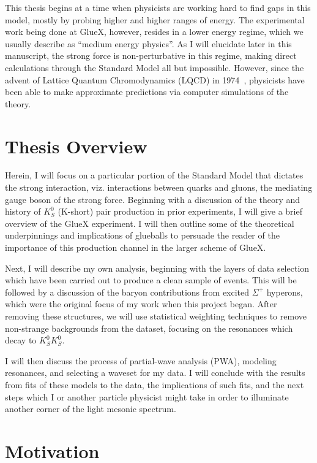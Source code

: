 This thesis begins at a time when physicists are working hard to find gaps in this model, mostly by probing higher and higher ranges of energy. The experimental work being done at GlueX, however, resides in a lower energy regime, which we usually describe as ``medium energy physics''. As I will elucidate later in this manuscript, the strong force is non-perturbative in this regime, making direct calculations through the Standard Model all but impossible. However, since the advent of Lattice Quantum Chromodynamics (LQCD) in 1974~\cite{Wilson1974}, physicists have been able to make approximate predictions via computer simulations of the theory.

\section{Thesis Overview}\label{sec:thesis_overview}

Herein, I will focus on a particular portion of the Standard Model that dictates the strong interaction, viz. interactions between quarks and gluons, the mediating gauge boson of the strong force. Beginning with a discussion of the theory and history of $K_S^0$ (K-short) pair production in prior experiments, I will give a brief overview of the GlueX experiment. I will then outline some of the theoretical underpinnings and implications of glueballs to persuade the reader of the importance of this production channel in the larger scheme of GlueX.

Next, I will describe my own analysis, beginning with the layers of data selection which have been carried out to produce a clean sample of events. This will be followed by a discussion of the baryon contributions from excited $\Sigma^+$ hyperons, which were the original focus of my work when this project began. After removing these structures, we will use statistical weighting techniques to remove non-strange backgrounds from the dataset, focusing on the resonances which decay to $K_S^0K_S^0$.

I will then discuss the process of partial-wave analysis (PWA), modeling resonances, and selecting a waveset for my data. I will conclude with the results from fits of these models to the data, the implications of such fits, and the next steps which I or another particle physicist might take in order to illuminate another corner of the light mesonic spectrum.

\section{Motivation}\label{sec:motivation}

